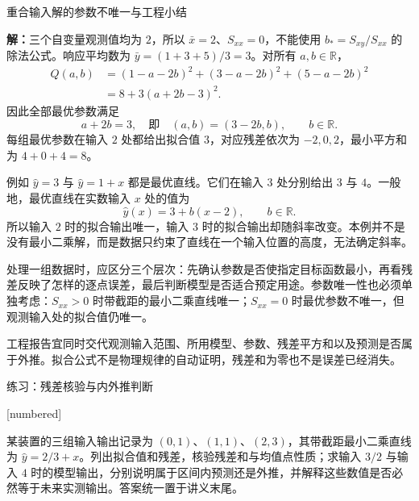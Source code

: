 \documentclass[aspectratio=169,10pt,fontset=fandol]{ctexbeamer}
\makeatletter
\newcommand{\mathagentexerciselabelcontext}[1]{%
\hypertarget<1>{#1}{}%
\edef\@currentHref{#1}%
}
\makeatother
\begin{document}
\begin{frame}[t,fragile]{重合输入解的参数不唯一与工程小结}
\small
{\small
\par\noindent\textbf{解：}三个自变量观测值均为 $2$，所以 $\bar{x}=2$、$S_{xx}=0$，不能使用 $b_*=S_{xy}/S_{xx}$ 的除法公式。响应平均数为 $\bar{y}=(1+3+5)/3=3$。对所有 $a,b\in\mathbb{R}$，
\[
\begin{aligned}
Q(a,b)&=(1-a-2b)^2+(3-a-2b)^2+(5-a-2b)^2\\
&=8+3(a+2b-3)^2.
\end{aligned}
\]
因此全部最优参数满足
\[
a+2b=3,
\quad\text{即}\quad (a,b)=(3-2b,b),\qquad b\in\mathbb{R}.
\]
每组最优参数在输入 $2$ 处都给出拟合值 $3$，对应残差依次为 $-2,0,2$，最小平方和为 $4+0+4=8$。


}
{\small
例如 $\hat{y}=3$ 与 $\hat{y}=1+x$ 都是最优直线。它们在输入 $3$ 处分别给出 $3$ 与 $4$。一般地，最优直线在实数输入 $x$ 处的值为
\[
\hat{y}(x)=3+b(x-2),\qquad b\in\mathbb{R}.
\]
所以输入 $2$ 时的拟合输出唯一，输入 $3$ 时的拟合输出却随斜率改变。本例并不是没有最小二乘解，而是数据只约束了直线在一个输入位置的高度，无法确定斜率。\par

}
{\small
处理一组数据时，应区分三个层次：先确认参数是否使指定目标函数最小，再看残差反映了怎样的逐点误差，最后判断模型是否适合预定用途。参数唯一性也必须单独考虑：$S_{xx}>0$ 时带截距的最小二乘直线唯一；$S_{xx}=0$ 时最优参数不唯一，但观测输入处的拟合值仍唯一。


}
{\small
工程报告宜同时交代观测输入范围、所用模型、参数、残差平方和以及预测是否属于外推。拟合公式不是物理规律的自动证明，残差和为零也不是误差已经消失。\par

}
\end{frame}
\begin{frame}[t,fragile]{练习：残差核验与内外推判断}
\normalsize
{\normalsize
[numbered]
\mathagentexerciselabelcontext{mathagent.exercise.U0050.0}
\begin{exercise}
\label{mathagent:exercise:792316d6ae426af3441a87022eb342411ffcb273e3da7957f4be83fb59518d0a}
某装置的三组输入输出记录为 $(0,1)$、$(1,1)$、$(2,3)$，其带截距最小二乘直线为 $\hat{y}=2/3+x$。列出拟合值和残差，核验残差和与均值点性质；求输入 $3/2$ 与输入 $4$ 时的模型输出，分别说明属于区间内预测还是外推，并解释这些数值是否必然等于未来实测输出。答案统一置于讲义末尾。
\end{exercise}
}
\end{frame}
\end{document}
